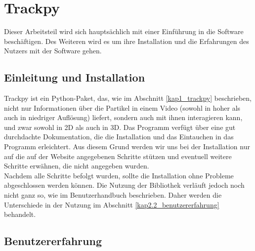 \chapter{Trackpy \label{kap2}}

Dieser Arbeitsteil  wird sich hauptsächlich mit einer Einführung in die Software beschäftigen. Des Weiteren wird es um ihre Installation und die Erfahrungen des Nutzers mit der Software gehen.

\section{Einleitung und Installation \label{Kap2.1_Einleitung_Installation}}
Trackpy ist ein Python-Paket, das, wie im Abschnitt \ref{kap1_trackpy} beschrieben, nicht nur Informationen über die Partikel in einem Video (sowohl in hoher als auch in niedriger Auflösung) liefert, sondern auch mit ihnen interagieren kann, und zwar sowohl in 2D als auch in 3D. Das Programm verfügt über eine gut durchdachte Dokumentation, die die Installation und das Eintauchen in das Programm erleichtert.
Aus diesem Grund werden wir uns bei der Installation nur auf die auf der Website \cite{tp_installation} angegebenen Schritte stützen und eventuell weitere Schritte erwähnen, die nicht angegeben wurden.\\
Nachdem alle Schritte befolgt wurden, sollte die Installation ohne Probleme abgeschlossen werden können. Die Nutzung der Bibliothek verläuft jedoch noch nicht ganz so, wie im Benutzerhandbuch beschrieben. Daher werden die Unterschiede in der Nutzung im Abschnitt \ref{kap2.2_benutzererfahrung} behandelt.


\section{Benutzererfahrung \label{kap2.2_benutzererfahrung}}

